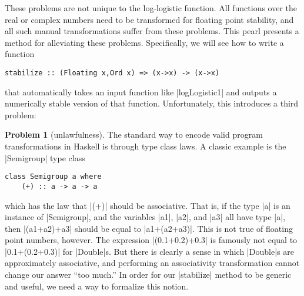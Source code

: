 \documentclass[preprint]{sigplanconf}
\theoremstyle{definition}
\newtheorem{problem}{Problem}
\begin{document}

These problems are not unique to the log-logistic function.
All functions over the real or complex numbers need to be transformed for floating point stability,
and all such manual transformations suffer from these problems.
This pearl presents a method for alleviating these problems.
Specifically, we will see how to write a function
\begin{lstlisting}
stabilize :: (Floating x,Ord x) => (x->x) -> (x->x)
\end{lstlisting}
that automatically takes an input function like |logLogistic1| and outputs a numerically stable version of that function.
Unfortunately, this introduces a third problem:

\begin{problem}[unlawfulness]
The standard way to encode valid program transformations in Haskell is through type class laws.
A classic example is the |Semigroup| type class
\begin{lstlisting}
class Semigroup a where
    (+) :: a -> a -> a
\end{lstlisting}
which has the law that |(+)| should be associative.
That is, if the type |a| is an instance of |Semigroup|,
and the variables |a1|, |a2|, and |a3| all have type |a|,
then |(a1+a2)+a3| should be equal to |a1+(a2+a3)|.
This is not true of floating point numbers, however.
The expression |(0.1+0.2)+0.3| is famously not equal to |0.1+(0.2+0.3)| for |Double|s.
But there is clearly a sense in which |Double|s are approximately associative,
and performing an associativity transformation cannot change our answer ``too much.''
In order for our |stabilize| method to be generic and useful,
we need a way to formalize this notion.
\end{problem}
\end{document}
